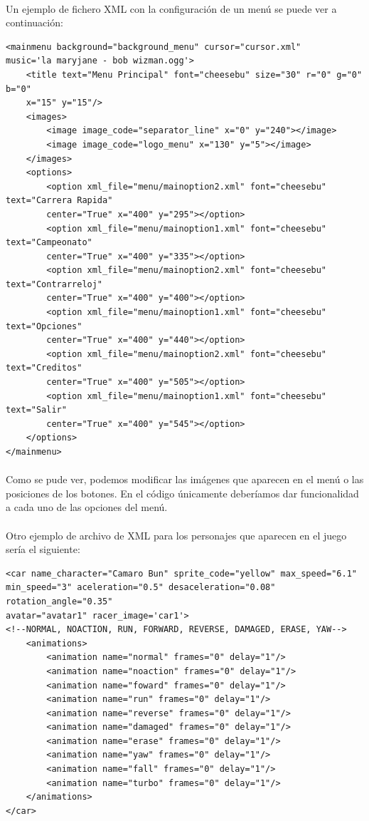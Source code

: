 \paragraph{}
Un ejemplo de fichero XML con la configuración de un menú se puede ver a continuación:

\begin{lstlisting}[style=XML]
<mainmenu background="background_menu" cursor="cursor.xml" 
music='la maryjane - bob wizman.ogg'>
    <title text="Menu Principal" font="cheesebu" size="30" r="0" g="0" b="0" 
    x="15" y="15"/>
    <images>
        <image image_code="separator_line" x="0" y="240"></image>
        <image image_code="logo_menu" x="130" y="5"></image>
    </images>
    <options>
        <option xml_file="menu/mainoption2.xml" font="cheesebu" text="Carrera Rapida" 
        center="True" x="400" y="295"></option>
        <option xml_file="menu/mainoption1.xml" font="cheesebu" text="Campeonato" 
        center="True" x="400" y="335"></option>
        <option xml_file="menu/mainoption2.xml" font="cheesebu" text="Contrarreloj" 
        center="True" x="400" y="400"></option>
        <option xml_file="menu/mainoption1.xml" font="cheesebu" text="Opciones" 
        center="True" x="400" y="440"></option>
        <option xml_file="menu/mainoption2.xml" font="cheesebu" text="Creditos" 
        center="True" x="400" y="505"></option>
        <option xml_file="menu/mainoption1.xml" font="cheesebu" text="Salir" 
        center="True" x="400" y="545"></option>
    </options>
</mainmenu>
\end{lstlisting}

\paragraph{}
Como se pude ver, podemos modificar las imágenes que aparecen en el menú o las posiciones de los botones.
En el código únicamente deberíamos dar funcionalidad a cada uno de las opciones del menú.

\paragraph{}
Otro ejemplo de archivo de XML para los personajes que aparecen en el juego sería el siguiente:

\begin{lstlisting}[style=XML]
<car name_character="Camaro Bun" sprite_code="yellow" max_speed="6.1" 
min_speed="3" aceleration="0.5" desaceleration="0.08" rotation_angle="0.35" 
avatar="avatar1" racer_image='car1'>
<!--NORMAL, NOACTION, RUN, FORWARD, REVERSE, DAMAGED, ERASE, YAW-->
    <animations>
        <animation name="normal" frames="0" delay="1"/>
        <animation name="noaction" frames="0" delay="1"/>
        <animation name="foward" frames="0" delay="1"/>
        <animation name="run" frames="0" delay="1"/>
        <animation name="reverse" frames="0" delay="1"/>
        <animation name="damaged" frames="0" delay="1"/>
        <animation name="erase" frames="0" delay="1"/>
        <animation name="yaw" frames="0" delay="1"/>
        <animation name="fall" frames="0" delay="1"/>
        <animation name="turbo" frames="0" delay="1"/>
    </animations>
</car>
\end{lstlisting}

